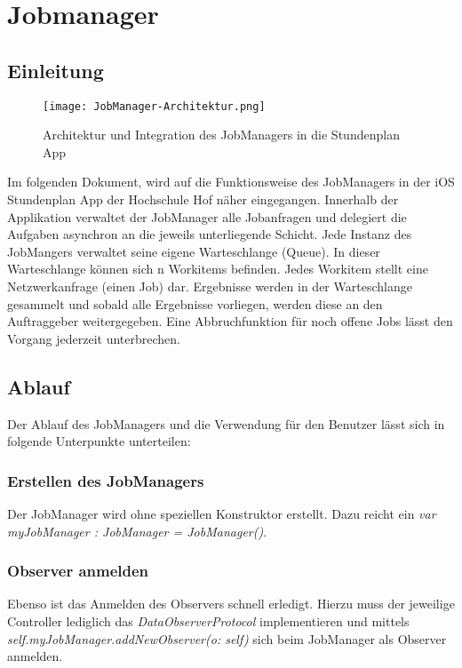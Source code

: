 
\chapter{Jobmanager}


\section{Einleitung}
\begin{figure}
	\centering
	\texttt{[image: JobManager-Architektur.png]}
	\caption{Architektur und Integration des JobManagers in die Stundenplan App}
	\label{img:JobManager-Architektur}
\end{figure}
Im folgenden Dokument, wird auf die Funktionsweise des JobManagers in der iOS Stundenplan App der Hochschule Hof näher eingegangen.
\newline Innerhalb der Applikation verwaltet der JobManager alle Jobanfragen und delegiert die Aufgaben asynchron an die jeweils unterliegende Schicht.
\newline
\newline Jede Instanz des JobMangers verwaltet seine eigene Warteschlange (Queue). In dieser Warteschlange können sich n Workitems befinden. Jedes Workitem stellt eine Netzwerkanfrage (einen Job) dar. Ergebnisse werden in der Warteschlange gesammelt und sobald alle Ergebnisse vorliegen, werden diese an den Auftraggeber weitergegeben.
\newline
Eine Abbruchfunktion für noch offene Jobs lässt den Vorgang jederzeit unterbrechen.
\newpage
\section{Ablauf}
Der Ablauf des JobManagers und die Verwendung für den Benutzer lässt sich in folgende Unterpunkte unterteilen:
\newline
\subsection{Erstellen des JobManagers}
Der JobManager wird ohne speziellen Konstruktor erstellt. Dazu reicht ein 
\newline  \textit{var myJobManager : JobManager = JobManager()}.

\subsection{Observer anmelden}
Ebenso ist das Anmelden des Observers schnell erledigt. Hierzu muss der jeweilige Controller lediglich das \textit{DataObserverProtocol}  implementieren und mittels
\newline
\newline
\textit{self.myJobManager.addNewObserver(o: self)}
\newline
\newline sich beim JobManager als Observer anmelden.

